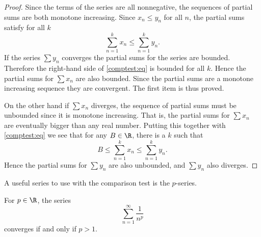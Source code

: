 \documentclass[12pt]{book}
\begin{document}
\begin{proof}
Since the terms of the series are all nonnegative, the sequences of
partial sums are both monotone increasing.
Since $x_n \leq y_n$ for all $n$, the partial sums
satisfy for all $k$
\begin{equation} \label{comptest:eq}
\sum_{n=1}^k x_n \leq \sum_{n=1}^k y_n .
\end{equation}
If the series $\sum y_n$ converges the partial sums for the series
are bounded.
Therefore the right-hand side of \eqref{comptest:eq}
is bounded for all $k$.
Hence the partial sums for $\sum x_n$
are also bounded.
Since the partial sums are a monotone increasing sequence
they are convergent.
The first item is thus proved.

On the other hand if $\sum x_n$ diverges, the sequence of partial sums
must be unbounded since it is monotone increasing.
That is, the partial
sums for $\sum x_n$ are eventually bigger than any real number.
Putting this
together with \eqref{comptest:eq} we see that for any $B \in
\R$, there is a $k$ such that 
\begin{equation*}
B \leq \sum_{n=1}^k x_n \leq \sum_{n=1}^k y_n .
\end{equation*}
Hence the partial sums for $\sum y_n$ are also unbounded, and $\sum
y_n$ also diverges.
\end{proof}

A useful series to use with the comparison test is the
$p$-series.

\begin{prop}
For $p \in \R$, 
the series
\begin{equation*}
\sum_{n=1}^\infty \frac{1}{n^p}
\end{equation*}
converges if and only if $p > 1$.
\end{prop}
\end{document}
